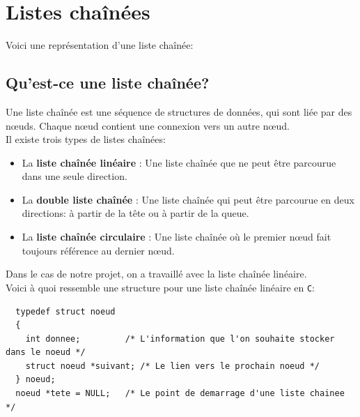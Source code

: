 \documentclass[11pt]{article}
\begin{document}
\newpage
\section{Listes chaînées}
Voici une représentation d'une liste chaînée: 

\subsection{Qu'est-ce une liste chaînée?}
Une liste chaînée est une séquence de structures de données, qui sont liée par des n\oe{}uds.
Chaque n\oe{}ud contient une connexion vers un autre n\oe{}ud.\\
Il existe trois types de listes chaînées:
\begin{itemize}
\item La \textbf{liste chaînée linéaire} : Une liste chaînée que ne peut être parcourue dans une seule direction.
\item La \textbf{double liste chaînée} : Une liste chaînée qui peut être parcourue en deux directions: à partir de la tête ou à partir de la queue.
\item La \textbf{liste chaînée circulaire} : Une liste chaînée où le premier n\oe{}ud fait toujours référence au dernier n\oe{}ud.
\end{itemize}

Dans le cas de notre projet, on a travaillé avec la liste chaînée linéaire.\\
Voici à quoi ressemble une structure pour une liste chaînée linéaire en \texttt{C}:
\begin{lstlisting}
  typedef struct noeud
  {
    int donnee;         /* L'information que l'on souhaite stocker dans le noeud */
    struct noeud *suivant; /* Le lien vers le prochain noeud */
  } noeud;
  noeud *tete = NULL;   /* Le point de demarrage d'une liste chainee */
\end{lstlisting}
\end{document}

